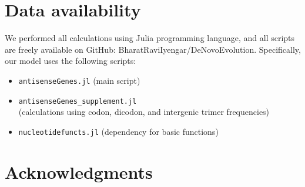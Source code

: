 \documentclass[12pt,a4paper]{article}
\begin{document}
\section*{Data availability}
We performed all calculations using Julia programming language, and all scripts are freely available on GitHub: BharatRaviIyengar/DeNovoEvolution. Specifically, our model uses the following scripts:

\vspace{-2em}
\begin{itemize}\setlength{\itemsep}{-1pt}
\item \texttt{antisenseGenes.jl} (main script)
\item \texttt{antisenseGenes\_supplement.jl} \\(calculations using codon, dicodon, and intergenic trimer frequencies)
\item \texttt{nucleotidefuncts.jl} (dependency for basic functions)
\end{itemize}

\section*{Acknowledgments}



\small

\end{document}

